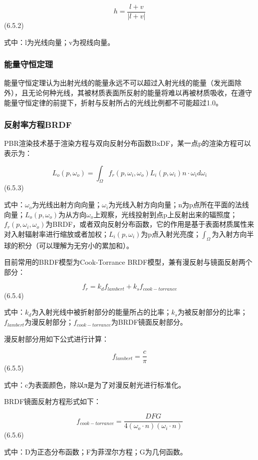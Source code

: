 \[h = \frac{l + v}{|l + v|}\] (6.5.2)

式中：l为光线向量；v为视线向量。

\subsubsection{能量守恒定理}\label{ux80fdux91cfux5b88ux6052ux5b9aux7406}

能量守恒定理认为出射光线的能量永远不可以超过入射光线的能量（发光面除外），且无论何种光线，其被材质表面所反射的能量将难以再被材质吸收，在遵守能量守恒定律的前提下，折射与反射所占的光线比例都不可能超过1.0。

\subsubsection{反射率方程BRDF}\label{ux53cdux5c04ux7387ux65b9ux7a0bbrdf}

PBR渲染技术基于渲染方程与双向反射分布函数BxDF，某一点p的渲染方程可以表示为：

\[L_o(p, \omega_o) = \int_{\Omega} f_r(p, \omega_i, \omega_o) L_i(p, \omega_i) n \cdot \omega_i d\omega_i\]
(6.5.3)

式中：\(\omega_o\)为光线出射方向向量；\(\omega_i\)为光线入射方向向量；n为p点所在平面的法线向量；\(L_o(p, \omega_o)\)为从方向\(\omega_o\)上观察，光线投射到点p上反射出来的辐照度；\(f_r(p, \omega_i, \omega_o)\)为BRDF，或者双向反射分布函数，它的作用是基于表面材质属性来对入射辐射率进行缩放或者加权；\(L_i(p, \omega_i)\)为p点入射光亮度；\(\int_{\Omega}\)为入射方向半球的积分（可以理解为无穷小的累加和）。

目前常用的BRDF模型为Cook-Torrance
BRDF模型，兼有漫反射与镜面反射两个部分：

\[f_r = k_d f_{lambert} + k_s f_{cook-torrance}\] (6.5.4)

式中：\(k_d\)为入射光线中被折射部分的能量所占的比率；\(k_s\)为被反射部分的比率；\(f_{lambert}\)为漫反射部分；\(f_{cook-torrance}\)为BRDF镜面反射部分。

漫反射部分用如下公式进行计算：

\[f_{lambert} = \frac{c}{\pi}\] (6.5.5)

式中：c为表面颜色，除以π是为了对漫反射光进行标准化。

BRDF镜面反射方程形式如下：

\[f_{cook-torrance} = \frac{DFG}{4(\omega_o \cdot n)(\omega_i \cdot n)}\]
(6.5.6)

式中：D为正态分布函数；F为菲涅尔方程；G为几何函数。


